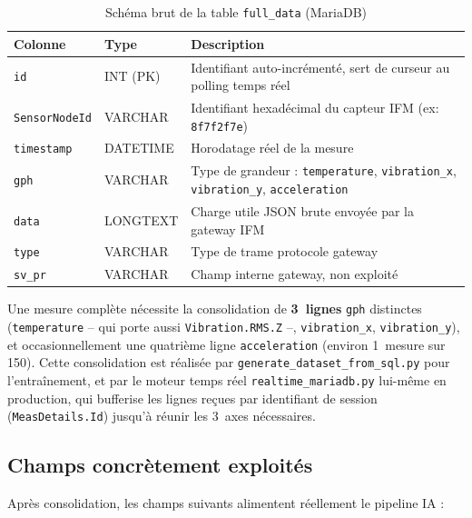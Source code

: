 \documentclass[12pt,a4paper]{report}
\begin{document}
\begin{table}[H]
\centering
\caption{Schéma brut de la table \texttt{full\_data} (MariaDB)}
\begin{tabular}{lll}
\toprule
\textbf{Colonne} & \textbf{Type} & \textbf{Description} \\
\midrule
\texttt{id}           & INT (PK) & Identifiant auto-incrémenté, sert de curseur au polling temps réel \\
\texttt{SensorNodeId} & VARCHAR  & Identifiant hexadécimal du capteur IFM (ex: \texttt{8f7f2f7e}) \\
\texttt{timestamp}    & DATETIME & Horodatage réel de la mesure \\
\texttt{gph}          & VARCHAR  & Type de grandeur : \texttt{temperature}, \texttt{vibration\_x}, \texttt{vibration\_y}, \texttt{acceleration} \\
\texttt{data}         & LONGTEXT & Charge utile JSON brute envoyée par la gateway IFM \\
\texttt{type}         & VARCHAR  & Type de trame protocole gateway \\
\texttt{sv\_pr}       & VARCHAR  & Champ interne gateway, non exploité \\
\bottomrule
\end{tabular}
\end{table}

Une mesure complète nécessite la consolidation de \textbf{3~lignes} \texttt{gph} distinctes
(\texttt{temperature} -- qui porte aussi \texttt{Vibration.RMS.Z} --, \texttt{vibration\_x},
\texttt{vibration\_y}), et occasionnellement une quatrième ligne \texttt{acceleration}
(environ 1~mesure sur 150). Cette consolidation est réalisée par
\texttt{generate\_dataset\_from\_sql.py} pour l'entraînement, et par le moteur temps réel
\texttt{realtime\_mariadb.py} lui-même en production, qui bufferise les lignes reçues par
identifiant de session (\texttt{MeasDetails.Id}) jusqu'à réunir les 3~axes nécessaires.

\subsection{Champs concrètement exploités}

Après consolidation, les champs suivants alimentent réellement le pipeline IA :
\end{document}
